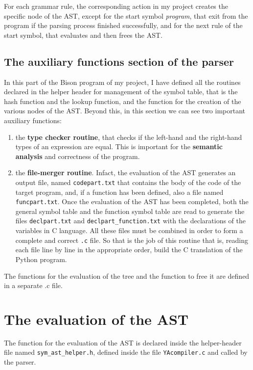 \documentclass[a4paper,12pt,,titlepage,openright]{report}
\begin{document}
For each grammar rule, the corresponding action in my project creates the specific node of the AST, except for the start symbol \textit{program}, that exit from the program if the parsing process finished successfully, and for the next rule of the start symbol, that evaluates and then frees the AST.

\subsection{The auxiliary functions section of the parser}
In this part of the Bison program of my project, I have defined all the routines declared in the helper header for management of the symbol table, that is the hash function and the lookup function, and the function for the creation of the various nodes of the AST.
Beyond this, in this section we can see two important auxiliary functions:
\begin{enumerate}
\item the \textbf{type checker routine}, that checks if the left-hand and the right-hand types of an expression are equal. This is important for the \textbf{semantic analysis} and correctness of the program.
\item the \textbf{file-merger routine}. Infact, the evaluation of the AST generates an output file, named \texttt{codepart.txt} that contains the body of the code of the target program, and, if a function has been defined, also a file named \texttt{funcpart.txt}. Once the evaluation of the AST has been completed, both the general symbol table and the function symbol table are read to generate the files \texttt{declpart.txt} and \texttt{declpart\_function.txt} with the declarations of the variables in C language. All these files must be combined in order to form a complete and correct \texttt{.c} file. So that is the job of this routine that is, reading each file line by line in the appropriate order, build the C translation of the Python program.
\end{enumerate}
The functions for the evaluation of the tree and the function to free it are defined in a separate .c file.

\section{The evaluation of the AST}
The function for the evaluation of the AST is declared inside the helper-header file named \texttt{sym\_ast\_helper.h}, defined inside the file \texttt{YAcompiler.c} and called by the parser.
\end{document}
